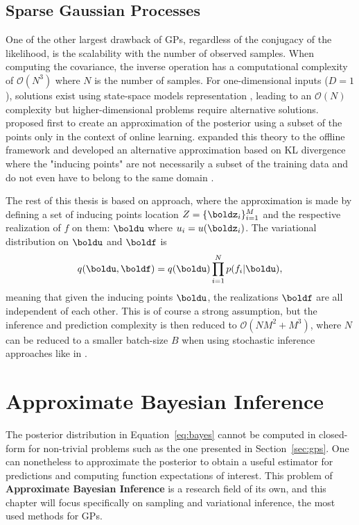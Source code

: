 \subsection{Sparse Gaussian Processes}
\label{sec:sparsegps}
One of the other largest drawback of \ac{GPs}, regardless of the conjugacy of the likelihood, is the scalability with the number of observed samples.
When computing the covariance, the inverse operation has a computational complexity of $\mathcal{O}(N^3)$ where $N$ is the number of samples.
For one-dimensional inputs ($D=1$), solutions exist using state-space models representation \cite{pmlr-v9-turner10a,solinInfiniteHorizonGaussianProcesses2018}, leading to an $\mathcal{O}(N)$ complexity but higher-dimensional problems require alternative solutions.
\citet{csato2002sparse} proposed first to create an approximation of the posterior using a subset of the points only in the context of online learning.
\citet{snelsonSparseGaussianProcesses2009} expanded this theory to the offline framework and \citet{Titsias2009} developed an alternative approximation based on KL divergence where the "inducing points" are not necessarily a subset of the training data and do not even have to belong to the same domain \cite{NIPS2009_5ea1649a, vdw2020framework}.

The rest of this thesis is based on \citet{Titsias2009} approach, where the approximation is made by defining a set of inducing points location $Z=\{\boldz_i\}_{i=1}^M$ and the respective realization of $f$ on them: $\boldu$ where $u_i = u(\boldz_i)$.
The variational distribution on $\boldu$ and $\boldf$ is
\begin{align}
    q(\boldu,\boldf) = q(\boldu)\prod_{i=1}^N p(f_i|\boldu),
    \label{eq:titsias_assumption}
\end{align}
meaning that given the inducing points $\boldu$, the realizations $\boldf$ are all independent of each other.
This is of course a strong assumption, but the inference and prediction complexity is then reduced to $\mathcal{O}(NM^2 + M^3)$, where $N$ can be reduced to a smaller batch-size $B$ when using stochastic inference approaches like in \cite{Hensman2013,Hensman2015}.

\section{Approximate Bayesian Inference}
\label{sec:approx_inf}
The posterior distribution in Equation~\eqref{eq:bayes} cannot be computed in closed-form for non-trivial problems such as the one presented in Section~\ref{sec:gps}.
One can nonetheless to approximate the posterior to obtain a useful estimator for predictions and computing function expectations of interest.
This problem of \textbf{Approximate Bayesian Inference} is a research field of its own, and this chapter will focus specifically on sampling and variational inference, the most used methods for \ac{GPs}.

